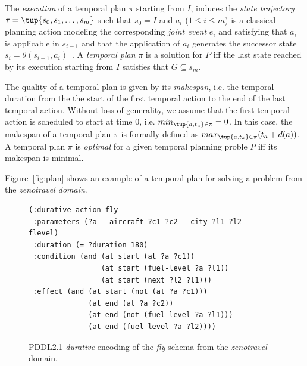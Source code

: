 \documentclass[runningheads]{llncs}
\begin{document}
The {\em execution} of a temporal plan $\pi$ starting from $I$, induces the {\em state trajectory} $\tau=\tup{s_0, s_1, \ldots, s_m}$ such that $s_0=I$ and $a_i$ ({\small $1\leq i\leq m$}) is a classical planning action modeling the corresponding {\em joint event} $e_i$ and satisfying that $a_i$ is applicable in $s_{i-1}$ and that the application of $a_i$ generates the successor state $s_i=\theta(s_{i-1},a_i)$~\cite{jimenez2015temporal}. A {\em temporal plan} $\pi$ is a solution for $P$ iff the last state reached by its execution starting from $I$ satisfies that $G\subseteq s_m$.

The quality of a temporal plan is given by its {\em makespan}, i.e. the temporal duration from the the start of the first temporal action to the end of the last temporal action. Without loss of generality, we assume that the first temporal action is scheduled to start at time 0, i.e. $min_{\tup{a,t_a}\in\pi}= 0$. In this case, the makespan of a temporal plan $\pi$ is formally defined as $max_{\tup{a,t_a}\in\pi}(t_a+d(a))$. A temporal plan $\pi$ is {\em optimal} for a given temporal planning proble $P$ iff its makespan is minimal.

Figure~\ref{fig:plan} shows an example of a temporal plan for solving a problem from the {\em zenotravel domain}.

\begin{figure}
	\begin{scriptsize}
		\begin{verbatim}
(:durative-action fly
 :parameters (?a - aircraft ?c1 ?c2 - city ?l1 ?l2 - flevel)
 :duration (= ?duration 180)
 :condition (and (at start (at ?a ?c1))
                 (at start (fuel-level ?a ?l1))
                 (at start (next ?l2 ?l1)))
 :effect (and (at start (not (at ?a ?c1)))
              (at end (at ?a ?c2))
              (at end (not (fuel-level ?a ?l1)))
              (at end (fuel-level ?a ?l2))))
		\end{verbatim}
	\end{scriptsize}
	\caption{PDDL2.1 {\em durative} encoding of the {\em fly} schema from the {\em zenotravel} domain.}
	\label{fig:flyt}
\end{figure}
\end{document}
